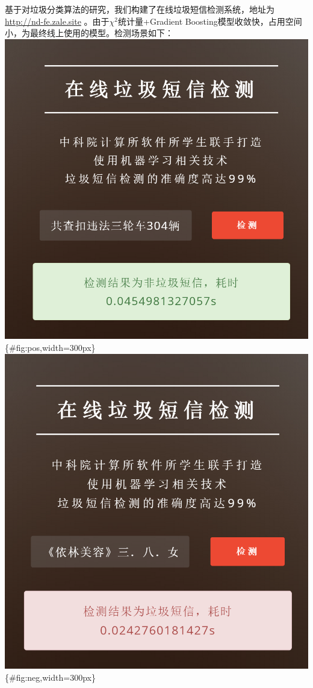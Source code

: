 基于对垃圾分类算法的研究，我们构建了在线垃圾短信检测系统，地址为\url{http://nd-fe.zale.site}
。由于\(\chi^2\)统计量+Gradient
Boosting模型收敛快，占用空间小，为最终线上使用的模型。检测场景如下：
\includegraphics{./images/res_pos.png}\{\#fig:pos,width=300px\}
\includegraphics{./images/res_neg.png}\{\#fig:neg,width=300px\}


